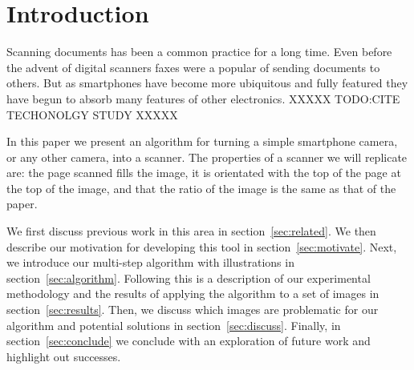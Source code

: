 \section{Introduction}
\label{sec:intro}

Scanning documents has been a common practice for a long time.
Even before the advent of digital scanners faxes were a popular of sending documents to others.
But as smartphones have become more ubiquitous and fully featured they have begun to absorb many features of other electronics.
XXXXX TODO:CITE TECHONOLGY STUDY XXXXX

In this paper we present an algorithm for turning a simple smartphone camera, or any other camera, into a scanner.
The properties of a scanner we will replicate are: the page scanned fills the image, it is orientated with the top of the page at the top of the image, and that the ratio of the image is the same as that of the paper.

We first discuss previous work in this area in section~\ref{sec:related}.
We then describe our motivation for developing this tool in section~\ref{sec:motivate}.
Next, we introduce our multi-step algorithm with illustrations in section~\ref{sec:algorithm}.
Following this is a description of our experimental methodology and the results of applying the algorithm to a set of images in section~\ref{sec:results}.
Then, we discuss which images are problematic for our algorithm and potential solutions in section~\ref{sec:discuss}.
Finally, in section~\ref{sec:conclude} we conclude with an exploration of future work and highlight out successes.
